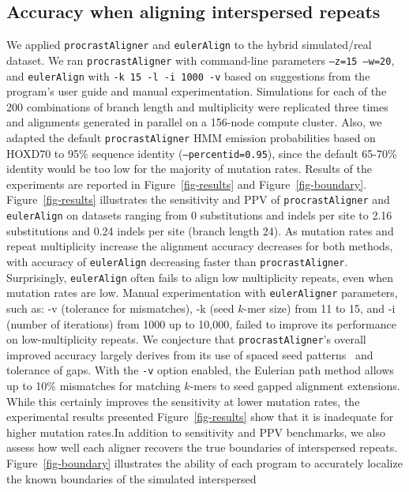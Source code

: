 \documentclass[10pt,journal,letterpaper,compsoc,peerreview]{IEEEtran}
\begin{document}
\subsection{Accuracy when aligning interspersed repeats}
We applied \texttt{procrastAligner} and \texttt{eulerAlign} to the
hybrid simulated/real dataset.  We ran \texttt{procrastAligner}
with command-line parameters \texttt{--z=15 --w=20}, and
\texttt{eulerAlign} with \texttt{-k 15 -l -i 1000 -v} based on suggestions
from the program's user guide and manual experimentation.
Simulations for each of the 200 combinations of branch length and
multiplicity were replicated three times and alignments generated in
parallel on a 156-node compute cluster.  Also, we adapted the default \texttt{procrastAligner} HMM emission probabilities based on HOXD70 to 95\% sequence identity (\texttt{--percentid=0.95}), since the default 65-70\% identity would be too low for the majority of mutation rates.  Results of the experiments
are reported in Figure~\ref{fig-results} and
Figure~\ref{fig-boundary}. Figure~\ref{fig-results} illustrates the
sensitivity and PPV of
\texttt{procrastAligner} and
\texttt{eulerAlign} on datasets ranging from 0 substitutions and
indels per site to 2.16 substitutions and 0.24 indels per site (branch length 24).  As
mutation rates and repeat multiplicity increase the alignment accuracy
decreases for both methods, with accuracy of \texttt{eulerAlign}
decreasing faster than \texttt{procrastAligner}.  Surprisingly, \texttt{eulerAlign}
often fails to align low multiplicity repeats, even when mutation rates are low.
Manual experimentation with \texttt{eulerAligner} parameters, such as: -v (tolerance for mismatches), -k (seed $k$-mer size) from 11 to 15, and -i (number of iterations) from 1000 up to 10,000, failed to improve its performance on low-multiplicity repeats.
We conjecture that \texttt{procrastAligner}'s overall improved accuracy largely derives
from its use of spaced seed patterns~\cite{ref-procrast} and tolerance
of gaps. With the \texttt{-v} option enabled, the Eulerian path method allows up to 10\% mismatches for matching $k$-mers to seed gapped alignment extensions. While this certainly improves the sensitivity at lower mutation rates, the experimental results presented Figure~\ref{fig-results} show that it is inadequate for higher mutation rates.In addition to sensitivity and PPV benchmarks, we also assess how well
each aligner recovers the true boundaries of interspersed
repeats.  Figure~\ref{fig-boundary} illustrates the ability of each
program to accurately localize the known boundaries of the simulated interspersed
\end{document}
